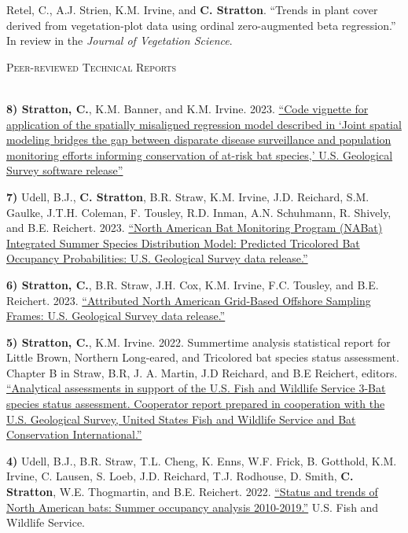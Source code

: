 \documentclass[a4paper]{article}
\newcommand{\lineunder} {
	\vspace*{-8pt} \\
	\hspace*{-18pt} \hrulefill \\
}
\newcommand{\header} [1] {
	{\hspace*{-18pt}\vspace*{6pt} \textcolor{Cerulean}{\textsc{#1}}}
	\vspace*{-6pt} \textcolor{Cerulean}{\lineunder}
}
\begin{document}
Retel, C., A.J. Strien, K.M. Irvine, and \textbf{C. Stratton}. ``Trends
in plant cover derived from vegetation-plot data using ordinal
zero-augmented beta regression.'' In review in the
\textit{Journal of Vegetation Science}. \vspace*{2mm}

\header{Peer-reviewed Technical Reports}
\vspace*{2mm}

\textbf{8) Stratton, C.}, K.M. Banner, and K.M. Irvine. 2023.
\href{https://code.usgs.gov/usgs/norock/irvine_k/spatial-misalignment-application}{``Code
vignette for application of the spatially misaligned regression model
described in `Joint spatial modeling bridges the gap between disparate
disease surveillance and population monitoring efforts informing
conservation of at-risk bat species,' U.S. Geological Survey software
release''} \vspace*{2mm}

\textbf{7)} Udell, B.J., \textbf{C. Stratton}, B.R. Straw, K.M. Irvine,
J.D. Reichard, S.M. Gaulke, J.T.H. Coleman, F. Tousley, R.D. Inman, A.N.
Schuhmann, R. Shively, and B.E. Reichert. 2023.
\href{https://doi.org/10.5066/P9MV37I7}{``North American Bat Monitoring
Program (NABat) Integrated Summer Species Distribution Model: Predicted
Tricolored Bat Occupancy Probabilities: U.S. Geological Survey data
release.''} \vspace*{2mm}

\textbf{6) Stratton, C.}, B.R. Straw, J.H. Cox, K.M. Irvine, F.C.
Tousley, and B.E. Reichert. 2023.
\href{https://doi.org/10.5066/P9H8NEOY}{``Attributed North American
Grid-Based Offshore Sampling Frames: U.S. Geological Survey data
release.''} \vspace*{2mm}

\textbf{5) Stratton, C.}, K.M. Irvine. 2022. Summertime analysis
statistical report for Little Brown, Northern Long-eared, and Tricolored
bat species status assessment. Chapter B in Straw, B.R, J. A. Martin,
J.D Reichard, and B.E Reichert, editors.
\href{https://doi.org/10.7944/P9B4RWEU}{``Analytical assessments in
support of the U.S. Fish and Wildlife Service 3-Bat species status
assessment. Cooperator report prepared in cooperation with the U.S.
Geological Survey, United States Fish and Wildlife Service and Bat
Conservation International.''} \vspace*{2mm}

\textbf{4)} Udell, B.J., B.R. Straw, T.L. Cheng, K. Enns, W.F. Frick, B.
Gotthold, K.M. Irvine, C. Lausen, S. Loeb, J.D. Reichard, T.J. Rodhouse,
D. Smith, \textbf{C. Stratton}, W.E. Thogmartin, and B.E. Reichert.
2022. \href{https://doi.org/10.5066/P92JGACB}{``Status and trends of
North American bats: Summer occupancy analysis 2010-2019.''} U.S. Fish
and Wildlife Service. \vspace*{2mm}
\end{document}
